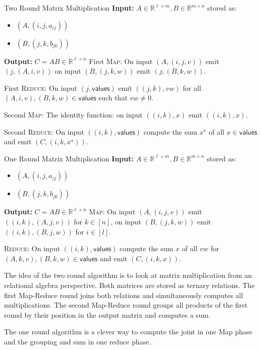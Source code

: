 \documentclass{panikzettel}
\begin{document}
\begin{algo}{Two Round Matrix Multiplication}
\textbf{Input:} $A \in \mathbb{R}^{\ell \times m}, B \in \mathbb{R}^{m \times n}$ stored as:
\begin{itemize}
	\item $(A,(i,j,a_{ij}))$
	\item $(B,(j,k,b_{jk}))$
\end{itemize}

\textbf{Output:} $C = AB \in \mathbb{R}^{\ell \times n}$
\tcblower
First \textsc{Map}: On input $(A,(i,j,v))$ emit $(j,(A,i,v))$ on input $(B,(j,k,w))$ emit $(j,(B,k,w))$.

First \textsc{Reduce}: On input $(j, \textsf{values})$ emit $((j,k),vw)$ for all $(A,i,v),(B,k,w) \in \textsf{values}$ such that $vw \neq 0$.

Second \textsc{Map}: The identity function: on input $((i,k),x)$ emit $((i,k),x)$.

Second \textsc{Reduce}: On input $((i,k), \textsf{values})$ compute the sum $x^\star$ of all $x \in \textsf{values}$ and emit $(C,(i,k,x^\star))$.
\end{algo}

\begin{algo}{One Round Matrix Multiplication}
\textbf{Input:} $A \in \mathbb{R}^{\ell \times m}, B \in \mathbb{R}^{m \times n}$ stored as:
\begin{itemize}
	\item $(A,(i,j,a_{ij}))$
	\item $(B,(j,k,b_{jk}))$
\end{itemize}

\textbf{Output:} $C = AB \in \mathbb{R}^{\ell \times n}$
\tcblower
\textsc{Map}: On input $(A,(i,j,v))$ emit $((i,k),(A,j,v))$ for $k \in [n]$, on input $(B,(j,k,w))$ emit $((i,k),(B,j,w))$ for $i \in [l]$.

\textsc{Reduce}: On input $((i,k), \textsf{values})$ compute the sum $x$ of all $vw$ for $(A,k,v),(B,k,w) \in \textsf{values}$ and emit $(C,(i,k,x))$.
\end{algo}

The idea of the two round algorithm is to look at matrix multiplication from an relational algebra perspective. Both matrices are stored as ternary relations.
The first Map-Reduce round joins both relations and simultaneously computes all multiplications.
The second Map-Reduce round groups all products of the first round by their position in the output matrix and computes a sum.

The one round algorithm is a clever way to compute the joint in one Map phase and the grouping and sum in one reduce phase.
\end{document}
